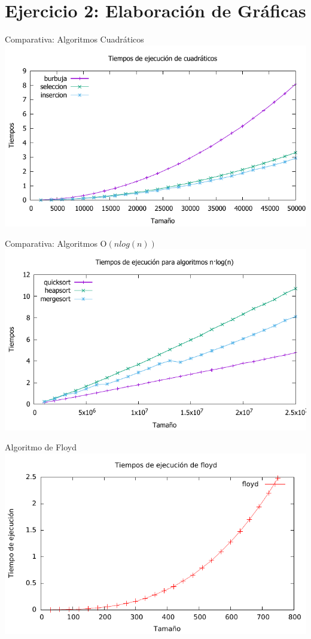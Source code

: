\documentclass[10pt,compress,usetitleprogressbar,mathserif]{beamer}
\begin{document}
\section{Ejercicio 2: \large{Elaboración de Gráficas}}


\begin{frame}{Comparativa: Algoritmos Cuadráticos}
	\includegraphics[width = \textwidth ]{comparativa_cuadraticos_g}
\end{frame}

\begin{frame}{Comparativa: Algoritmos O$(nlog(n))$}
		\includegraphics[width = \textwidth ]{comparativa_logaritmicos_g}
\end{frame}

\begin{frame}{Algoritmo de Floyd}
		\includegraphics[width = \textwidth ]{floyd_g}
\end{frame}
\end{document}
